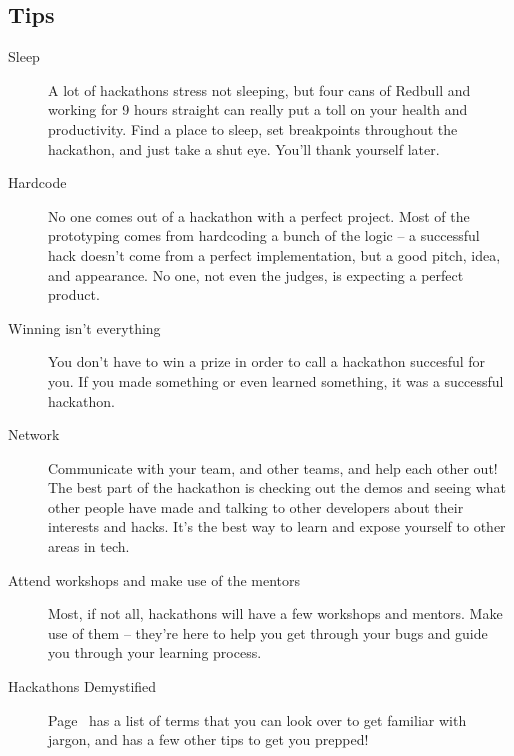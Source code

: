 \documentclass{article}
\begin{document}
\subsection{Tips}
\begin{description}
\item[Sleep] A lot of hackathons stress not sleeping, but four cans of
  Redbull and working for 9 hours straight can really put a toll on your health
  and productivity. Find a place to sleep, set breakpoints throughout the
  hackathon, and just take a shut eye. You'll thank yourself later.
\item[Hardcode] No one comes out of a hackathon with a perfect project. Most of
  the prototyping comes from hardcoding a bunch of the logic -- a successful
  hack doesn't come from a perfect implementation, but a good pitch, idea, and
  appearance. No one, not even the judges, is expecting a perfect product.
\item[Winning isn't everything] You don't have to win a prize in order to call a
  hackathon succesful for you. If you made something or even learned something,
  it was a successful hackathon.
\item[Network] Communicate with your team, and other teams, and help each other
  out! The best part of the hackathon is checking out the demos and seeing what
  other people have made and talking to other developers about their interests
  and hacks. It's the best way to learn and expose yourself to other areas in
  tech.
\item[Attend workshops and make use of the mentors] Most, if not all, hackathons
  will have a few workshops and mentors. Make use of them -- they're here to
  help you get through your bugs and guide you through your learning process.
\item[Hackathons Demystified] Page~\pageref{glossary} has a list of terms that
  you can look over to get familiar with jargon, and has a few other tips to get
  you prepped!
\end{description}
\end{document}
